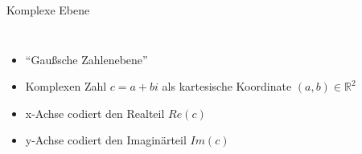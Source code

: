 \begin{frame}{Komplexe Ebene}    
    \begin{columns}[c]
            \begin{itemize}
                \item "`Gaußsche Zahlenebene"'
                \item Komplexen Zahl $c=a+bi$ als kartesische Koordinate $(a,b) \in \mathbb{R}^2$
                \item x-Achse codiert den Realteil $Re(c)$
                \item y-Achse codiert den Imaginärteil $Im(c)$
            \end{itemize}
    \end{columns}
\end{frame}





